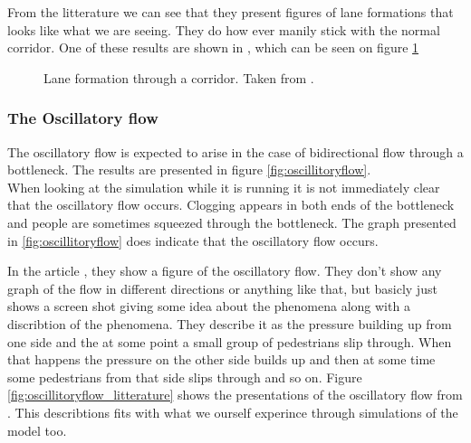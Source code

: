 From the litterature we can see that they present figures of lane formations
 that looks like what we are seeing. They do how ever manily stick with the normal corridor. One of these results are shown in \cite{lanes}, which can be seen on figure \ref{fig:laneformation_litterature}
\begin{figure}[h]
\centering
{}
\caption{Lane formation through a corridor. Taken from \cite{lanes}.}
\label{fig:laneformation_litterature}
\end{figure}
 


\subsubsection{The Oscillatory flow}
The oscillatory flow is expected to arise in the case of bidirectional
flow through a bottleneck. The results are presented in figure
\ref{fig:oscillitoryflow}.\\

When looking at the simulation while it is running it is not
immediately clear that the oscillatory flow occurs. Clogging
appears in both ends of the bottleneck and people are sometimes
squeezed through the bottleneck. The graph presented in
\ref{fig:oscillitoryflow} does indicate that the oscillatory
flow occurs.

In the article \cite{oscil}, they show a figure of the oscillatory flow. They 
don't show any graph of the flow in different directions or anything like 
that, but basicly just shows a screen shot giving some idea about the 
phenomena along with a discribtion of the phenomena. They describe it as the 
pressure building up from one side and the at some point a small group of 
pedestrians slip through. When that happens the pressure on the other side 
builds up and then at some time some pedestrians from that side slips through 
and so on. Figure \ref{fig:oscillitoryflow_litterature} shows the 
presentations of the oscillatory flow from \cite{oscil}. This describtions 
fits with what we ourself experince through simulations of the model too.

